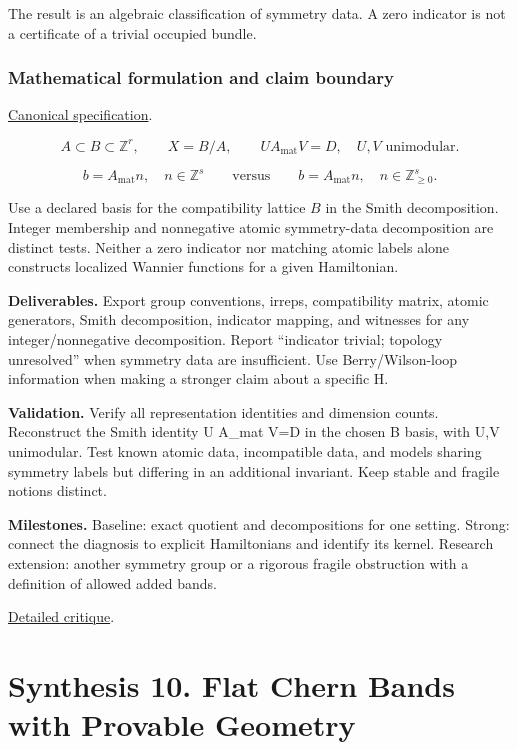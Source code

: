 \documentclass[
  11pt,
]{article}
\begin{document}
The result is an algebraic classification of symmetry data. A zero
indicator is not a certificate of a trivial occupied bundle.

\subsubsection{Mathematical formulation and claim boundary}

\href{https://github.com/rick-stevens-ai/Pure-Thought/blob/main/PRDs/15-Topological-Quantum-Chemistry.md}{Canonical
specification}.

\[A\subset B\subset\mathbb Z^r,\qquad X=B/A,\qquad
UA_{\mathrm{mat}}V=D,\quad U,V\text{ unimodular}.\]

\[b=A_{\mathrm{mat}}n,\quad n\in\mathbb Z^s
\qquad\text{versus}\qquad b=A_{\mathrm{mat}}n,\quad n\in\mathbb Z_{\ge0}^s.\]

Use a declared basis for the compatibility lattice \(B\) in the Smith
decomposition. Integer membership and nonnegative atomic symmetry-data
decomposition are distinct tests. Neither a zero indicator nor matching
atomic labels alone constructs localized Wannier functions for a given
Hamiltonian.

\textbf{Deliverables.} Export group conventions, irreps, compatibility
matrix, atomic generators, Smith decomposition, indicator mapping, and
witnesses for any integer/nonnegative decomposition. Report ``indicator
trivial; topology unresolved'' when symmetry data are insufficient. Use
Berry/Wilson-loop information when making a stronger claim about a
specific H.

\textbf{Validation.} Verify all representation identities and dimension
counts. Reconstruct the Smith identity U A\_mat V=D in the chosen B
basis, with U,V unimodular. Test known atomic data, incompatible data,
and models sharing symmetry labels but differing in an additional
invariant. Keep stable and fragile notions distinct.

\textbf{Milestones.} Baseline: exact quotient and decompositions for one
setting. Strong: connect the diagnosis to explicit Hamiltonians and
identify its kernel. Research extension: another symmetry group or a
rigorous fragile obstruction with a definition of allowed added bands.

\href{https://github.com/rick-stevens-ai/Pure-Thought/blob/main/reviews/15-Topological-Quantum-Chemistry.md}{Detailed
critique}.

\section{Synthesis 10. Flat Chern Bands with Provable Geometry}
\end{document}

